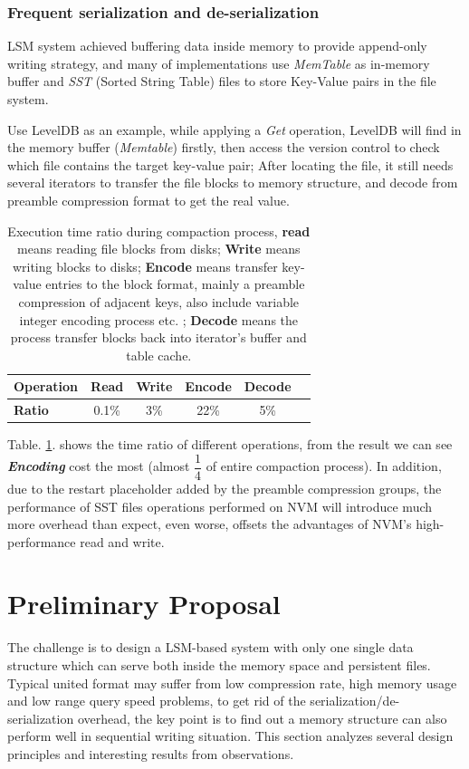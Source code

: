 \subsubsection{Frequent serialization and de-serialization}

LSM system achieved buffering data inside memory to provide append-only writing strategy, and many of implementations use \textit{MemTable} as in-memory buffer and \textit{SST} (Sorted String Table) files to store Key-Value pairs in the file system. 

Use LevelDB\cite{LevelDBo44:online} as an example, while applying a \textit{Get} operation, LevelDB will find in the memory buffer (\textit{Memtable}) firstly, then access the version control to check which file contains the target key-value pair; After locating the file, it still needs several iterators to transfer the file blocks to memory structure, and decode from preamble compression format to get the real value. 
\begin{table}[t]
	\centering
	\begin{tabular}{|l|c|c|c|c|c|}
		\hline
		\textbf{Operation} & Read & Write & Encode & Decode  \\ \hline
		\textbf{Ratio} & 0.1\% & 3\% & 22\% & 5\%  \\ \hline
	\end{tabular}
	\caption{Execution time ratio during compaction process, \textbf{read} means reading file blocks from disks; \textbf{Write} means writing blocks to disks; \textbf{Encode} means transfer key-value entries to the block format, mainly a 
		preamble compression of adjacent keys, also include variable integer encoding process etc. ; \textbf{Decode} means the process transfer blocks back into iterator's buffer and table cache.}
	\label{tab:file_read_ratio}
\end{table}

Table. \ref{tab:file_read_ratio}. shows the time ratio of different operations, from the result we can see \textbf{\textit{Encoding}} cost the most (almost $\dfrac{1}{4}$ of entire compaction process). In addition, due to the restart placeholder added by the preamble compression groups, the performance of SST files operations performed on NVM will introduce much more overhead than expect, even worse, offsets the advantages of NVM's high-performance read and write.

\section{Preliminary Proposal}
The challenge is to design a LSM-based system with only one single data structure which can serve both inside the memory space and persistent files. Typical united format may suffer from low compression rate, high memory usage and low range query speed problems, to get rid of the serialization/de-serialization overhead, the key point is to find out a memory structure can also perform well in sequential writing situation. This section analyzes several design principles and interesting results from observations.


